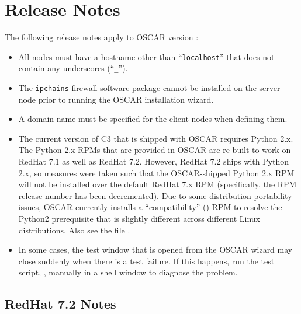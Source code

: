 %
%
%

\section{Release Notes}
\label{sec:release-notes}

The following release notes apply to OSCAR version \oscarversion:

\begchange

\begin{itemize}
\item All nodes must have a hostname other than ``{\tt localhost}''
  that does not contain any underscores (``{\tt \_}'').
  
\item The {\tt ipchains} firewall software package cannot be installed
  on the server node prior to running the OSCAR installation wizard.
  
\item A domain name must be specified for the client nodes when
  defining them.
  
\item The current version of C3 that is shipped with OSCAR requires
  Python 2.x.  The Python 2.x RPMs that are provided in OSCAR are
  re-built to work on RedHat 7.1 as well as RedHat 7.2.  However,
  RedHat 7.2 ships with Python 2.x, so measures were taken such that
  the OSCAR-shipped Python 2.x RPM will not be installed over the
  default RedHat 7.x RPM (specifically, the RPM release number has
  been decremented).  Due to some distribution portability issues,
  OSCAR currently installs a ``compatibility''
  () RPM to resolve the Python2
  prerequisite that is slightly different across different Linux
  distributions.  Also see the file
  .

\item In some cases, the test window that is opened from the 
  OSCAR wizard may close suddenly when there is a test failure. If
  this happens, run the test script, ,
  manually in a shell window to diagnose the problem.
\end{itemize}

\endchange


\subsection{RedHat 7.2 Notes}
\label{subsec:rh72notes}

